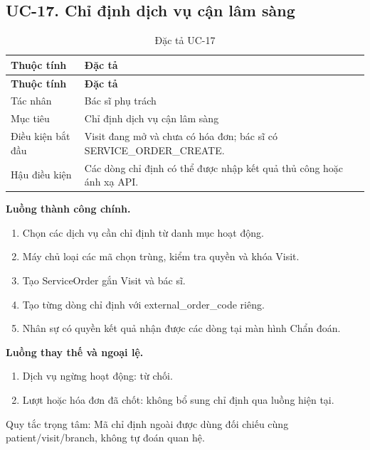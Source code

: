 \clearpage

\subsection{UC-17.\allowbreak{} Chỉ định dịch vụ cận lâm sàng}
\label{uc:17}

{\small\setlength{\tabcolsep}{3pt}\renewcommand{\arraystretch}{1.12}
\begin{longtable}{@{}L{\textwidth-1.32pt\relax} L{\textwidth-4.68pt\relax}@{}}
\caption{Đặc tả UC-17}\\
\toprule
\textbf{Thuộc tính} & \textbf{Đặc tả}\\\midrule
\endfirsthead
\toprule
\textbf{Thuộc tính} & \textbf{Đặc tả}\\\midrule
\endhead
\bottomrule\endlastfoot
Tác nhân & Bác sĩ phụ trách\\[3pt]
Mục tiêu & Chỉ định dịch vụ cận lâm sàng\\[3pt]
Điều kiện bắt đầu & Visit đang mở và chưa có hóa đơn; bác sĩ có SERVICE\_\allowbreak{}ORDER\_\allowbreak{}CREATE.\allowbreak{}\\[3pt]
Hậu điều kiện & Các dòng chỉ định có thể được nhập kết quả thủ công hoặc ánh xạ API.\allowbreak{}\\[3pt]
\end{longtable}}
\noindent\textbf{Luồng thành công chính.}
\begin{enumerate}
\item Chọn các dịch vụ cần chỉ định từ danh mục hoạt động.\allowbreak{}
\item Máy chủ loại các mã chọn trùng, kiểm tra quyền và khóa Visit.\allowbreak{}
\item Tạo Service\allowbreak{}Order gắn Visit và bác sĩ.\allowbreak{}
\item Tạo từng dòng chỉ định với external\_\allowbreak{}order\_\allowbreak{}code riêng.\allowbreak{}
\item Nhân sự có quyền kết quả nhận được các dòng tại màn hình Chẩn đoán.\allowbreak{}
\end{enumerate}
\noindent\textbf{Luồng thay thế và ngoại lệ.}
\begin{enumerate}
\item Dịch vụ ngừng hoạt động:\allowbreak{} từ chối.\allowbreak{}
\item Lượt hoặc hóa đơn đã chốt:\allowbreak{} không bổ sung chỉ định qua luồng hiện tại.\allowbreak{}
\end{enumerate}
Quy tắc trọng tâm:\allowbreak{} Mã chỉ định ngoài được dùng đối chiếu cùng patient/\allowbreak{}visit/\allowbreak{}branch, không tự đoán quan hệ.\allowbreak{}

